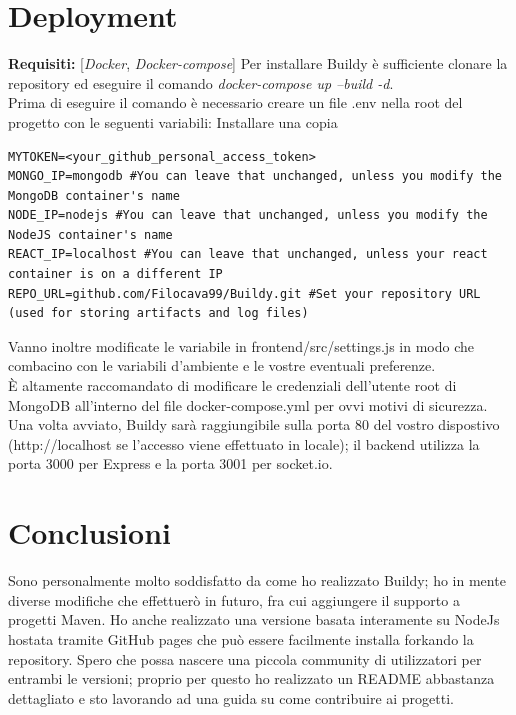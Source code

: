 \documentclass{report}
\begin{document}
\section{Deployment}
\textbf{Requisiti:} [\textit{Docker}, \textit{Docker-compose}]
Per installare Buildy è sufficiente clonare la repository ed eseguire il comando \textit{docker-compose up --build -d}.\\
Prima di eseguire il comando è necessario creare un file .env nella root del progetto con le seguenti variabili:
Installare una copia
\begin{lstlisting}
MYTOKEN=<your_github_personal_access_token>
MONGO_IP=mongodb #You can leave that unchanged, unless you modify the MongoDB container's name
NODE_IP=nodejs #You can leave that unchanged, unless you modify the NodeJS container's name
REACT_IP=localhost #You can leave that unchanged, unless your react container is on a different IP
REPO_URL=github.com/Filocava99/Buildy.git #Set your repository URL (used for storing artifacts and log files)
\end{lstlisting}
Vanno inoltre modificate le variabile in frontend/src/settings.js in modo che combacino con le variabili d'ambiente e le vostre eventuali preferenze.\\
È altamente raccomandato di modificare le credenziali dell'utente root di MongoDB all'interno del file docker-compose.yml per ovvi motivi di sicurezza.\\
Una volta avviato, Buildy sarà raggiungibile sulla porta 80 del vostro dispostivo (http://localhost se l'accesso viene effettuato in locale); il backend utilizza la porta 3000 per Express e la porta 3001 per socket.io.\\

\section{Conclusioni}
Sono personalmente molto soddisfatto da come ho realizzato Buildy; ho in mente diverse modifiche che effettuerò in futuro, fra cui aggiungere il supporto a progetti Maven. Ho anche realizzato una versione basata interamente su NodeJs hostata tramite GitHub pages che può essere facilmente installa forkando la repository.
Spero che possa nascere una piccola community di utilizzatori per entrambi le versioni; proprio per questo ho realizzato un README abbastanza dettagliato e sto lavorando ad una guida su come contribuire ai progetti.
\end{document}
